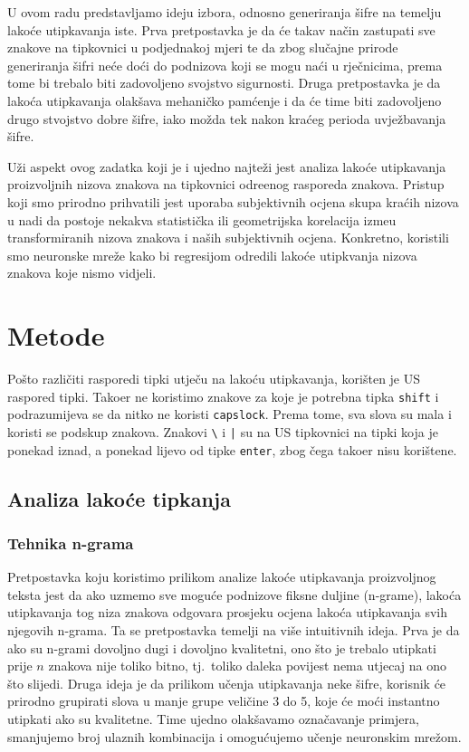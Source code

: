 \documentclass[a4paper,twocolumn,dvipdfm]{article}
\begin{document}
U ovom radu predstavljamo ideju izbora, odnosno generiranja \v{s}ifre na
temelju lako\'ce utipkavanja iste. Prva pretpostavka je da \'ce takav na\v{c}in
zastupati sve znakove na tipkovnici u podjednakoj mjeri te da zbog slu\v{c}ajne
prirode generiranja \v{s}ifri ne\'ce do\'ci do podnizova koji se mogu na\'ci u
rje\v{c}nicima, prema tome bi trebalo biti zadovoljeno svojstvo sigurnosti.
Druga pretpostavka je da lako\'ca utipkavanja olak\v{s}ava mehani\v{c}ko
pam\'cenje i da \'ce time biti zadovoljeno drugo stvojstvo dobre \v{s}ifre,
iako mo\v{z}da tek nakon kra\'ceg perioda uvje\v{z}bavanja \v{s}ifre.

U\v{z}i aspekt ovog zadatka koji je i ujedno najte\v{z}i jest analiza lako\'ce
utipkavanja proizvoljnih nizova znakova na tipkovnici odre\dj enog rasporeda
znakova. Pristup koji smo prirodno prihvatili jest uporaba subjektivnih ocjena
skupa kra\'cih nizova u nadi da postoje nekakva statisti\v{c}ka ili geometrijska
korelacija izme\dj u transformiranih nizova znakova i na\v{s}ih subjektivnih ocjena.
Konkretno, koristili smo neuronske mre\v{z}e kako bi regresijom odredili lako\'ce
utipkvanja nizova znakova koje nismo vidjeli.

\section{Metode}

Po\v{s}to razli\v{c}iti rasporedi tipki utje\v{c}u na lako\'cu utipkavanja,
kori\v{s}ten je US raspored tipki. Tako\dj er ne koristimo znakove za koje je
potrebna tipka \texttt{shift} i podrazumijeva se da nitko ne koristi
\texttt{capslock}. Prema tome, sva slova su mala i koristi se podskup znakova.
Znakovi \texttt{\textbackslash} i \texttt{|} su na US tipkovnici na tipki koja
je ponekad iznad, a ponekad lijevo od tipke \texttt{enter}, zbog \v{c}ega
tako\dj er nisu kori\v{s}tene.

\subsection{Analiza lako\'ce tipkanja}

\subsubsection{Tehnika n-grama}

Pretpostavka koju koristimo prilikom analize lako\'ce utipkavanja proizvoljnog
teksta jest da ako uzmemo sve mogu\'ce podnizove fiksne duljine (n-grame),
lako\'ca utipkavanja tog niza znakova odgovara prosjeku ocjena lako\'ca
utipkavanja svih njegovih n-grama. Ta se pretpostavka temelji na vi\v{s}e
intuitivnih ideja. Prva je da ako su n-grami dovoljno dugi i dovoljno
kvalitetni, ono \v{s}to je trebalo utipkati prije $n$ znakova nije toliko
bitno, tj.\ toliko daleka povijest nema utjecaj na ono \v{s}to slijedi. Druga
ideja je da prilikom u\v{c}enja utipkavanja neke \v{s}ifre, korisnik \'ce
prirodno grupirati slova u manje grupe veli\v{c}ine 3 do 5, koje \'ce mo\'ci
instantno utipkati ako su kvalitetne. Time ujedno olak\v{s}avamo
ozna\v{c}avanje primjera, smanjujemo broj ulaznih kombinacija i omogu\'cujemo
u\v{c}enje neuronskim mre\v{z}om.
\end{document}
